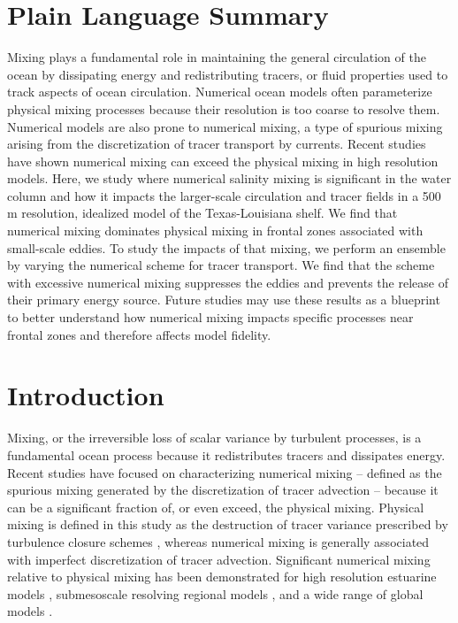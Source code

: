 \section{Plain Language Summary}
Mixing plays a fundamental role in maintaining the general circulation of the ocean by dissipating energy and redistributing tracers, or fluid properties used to track aspects of ocean circulation. Numerical ocean models often parameterize physical mixing processes because their resolution is too coarse to resolve them. Numerical models are also prone to numerical mixing, a type of spurious mixing arising from the discretization of tracer transport by currents. Recent studies have shown numerical mixing can exceed the physical mixing in high resolution models. Here, we study where numerical salinity mixing is significant in the water column and how it impacts the larger-scale circulation and tracer fields in a 500 m resolution, idealized model of the Texas-Louisiana shelf. We find that numerical mixing dominates physical mixing in frontal zones associated with small-scale eddies. To study the impacts of that mixing, we perform an ensemble by varying the numerical scheme for tracer transport. We find that the scheme with excessive numerical mixing suppresses the eddies and prevents the release of their primary energy source. Future studies may use these results as a blueprint to better understand how numerical mixing impacts specific processes near frontal zones and therefore affects model fidelity. 

\section{Introduction} \label{sec:intro}
Mixing, or the irreversible loss of scalar variance by turbulent processes, is a fundamental ocean process because it redistributes tracers and dissipates energy. Recent studies have focused on characterizing numerical mixing -- defined as the spurious mixing generated by the discretization of tracer advection -- because it can be a significant fraction of, or even exceed, the physical mixing. Physical mixing is defined in this study as the destruction of tracer variance prescribed by turbulence closure schemes \citep{Burchard_2008, MacCready_2018}, whereas numerical mixing is generally associated with imperfect discretization of tracer advection. Significant numerical mixing relative to physical mixing has been demonstrated for high resolution estuarine models \citep{Ralston_2017, Rennau_2009, Wang_2021}, submesoscale resolving regional models \citep{Schlichting23}, and a wide range of global models \citep{Griffies_2000, Holmes_2021, Ilicak_2012, megann2018estimating}.


